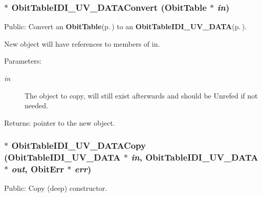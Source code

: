 \subsubsection{$\ast$ Obit\-Table\-IDI\_\-UV\_\-DATAConvert ({\bf Obit\-Table} $\ast$ {\em in})}\label{ObitTableIDI__UV__DATA_8h_a16}


Public: Convert an {\bf Obit\-Table}{\rm (p.\,\pageref{structObitTable})} to an {\bf Obit\-Table\-IDI\_\-UV\_\-DATA}{\rm (p.\,\pageref{structObitTableIDI__UV__DATA})}. 

New object will have references to members of in. \begin{Desc}
\item[Parameters:]
\begin{description}
\item[{\em in}]The object to copy, will still exist afterwards and should be Unrefed if not needed. \end{description}
\end{Desc}
\begin{Desc}
\item[Returns:]pointer to the new object. \end{Desc}
\subsubsection{$\ast$ Obit\-Table\-IDI\_\-UV\_\-DATACopy ({\bf Obit\-Table\-IDI\_\-UV\_\-DATA} $\ast$ {\em in}, {\bf Obit\-Table\-IDI\_\-UV\_\-DATA} $\ast$ {\em out}, {\bf Obit\-Err} $\ast$ {\em err})}\label{ObitTableIDI__UV__DATA_8h_a14}


Public: Copy (deep) constructor. 

